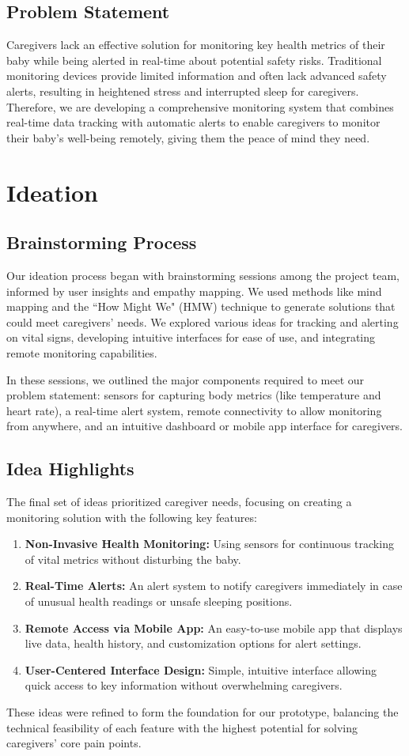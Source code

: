 \documentclass[12pt,a4paper]{report}
\begin{document}
\section{Problem Statement}
Caregivers lack an effective solution for monitoring key health metrics of their baby while being alerted in real-time about potential safety risks. Traditional monitoring devices provide limited information and often lack advanced safety alerts, resulting in heightened stress and interrupted sleep for caregivers. Therefore, we are developing a comprehensive monitoring system that combines real-time data tracking with automatic alerts to enable caregivers to monitor their baby’s well-being remotely, giving them the peace of mind they need.

\chapter{Ideation}
\section{Brainstorming Process}
Our ideation process began with brainstorming sessions among the project team, informed by user insights and empathy mapping. We used methods like mind mapping and the ``How Might We" (HMW) technique to generate solutions that could meet caregivers' needs. We explored various ideas for tracking and alerting on vital signs, developing intuitive interfaces for ease of use, and integrating remote monitoring capabilities.

In these sessions, we outlined the major components required to meet our problem statement: sensors for capturing body metrics (like temperature and heart rate), a real-time alert system, remote connectivity to allow monitoring from anywhere, and an intuitive dashboard or mobile app interface for caregivers.

\section{Idea Highlights}
The final set of ideas prioritized caregiver needs, focusing on creating a monitoring solution with the following key features:
\begin{enumerate}
  \item \textbf{Non-Invasive Health Monitoring:} Using sensors for continuous tracking of vital metrics without disturbing the baby.
  \item \textbf{Real-Time Alerts:} An alert system to notify caregivers immediately in case of unusual health readings or unsafe sleeping positions.
  \item \textbf{Remote Access via Mobile App:} An easy-to-use mobile app that displays live data, health history, and customization options for alert settings.
  \item \textbf{User-Centered Interface Design:} Simple, intuitive interface allowing quick access to key information without overwhelming caregivers.
\end{enumerate}
These ideas were refined to form the foundation for our prototype, balancing the technical feasibility of each feature with the highest potential for solving caregivers’ core pain points.
\end{document}
